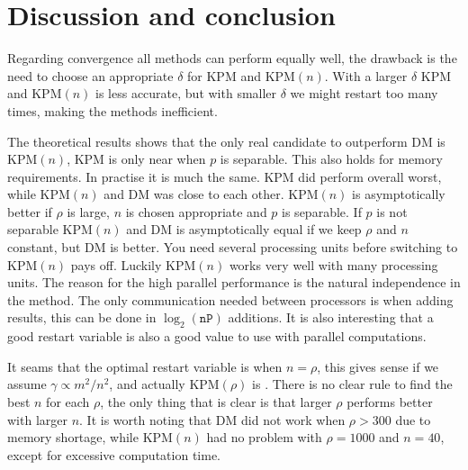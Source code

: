 \chapter{Discussion and conclusion}%
Regarding convergence all methods can perform equally well, the drawback is the need to choose an appropriate $\delta$ for KPM and KPM$(n)$. With a larger $\delta$ KPM and KPM$(n)$ is less accurate, but with smaller $\delta$ we might restart too many times, making the methods inefficient. 


The theoretical results shows that the only real candidate to outperform DM is KPM$(n)$, KPM is only near when $p$ is separable. This also holds for memory requirements. In practise it is much the same. KPM did perform overall worst, while KPM$(n)$ and DM was close to each other. KPM$(n)$ is asymptotically better if $\rho$ is large, $n$ is chosen appropriate and $p$ is separable. If $p$ is not separable  KPM$(n)$ and DM is asymptotically equal if we keep $\rho$ and $n$ constant, but DM is better. You need several processing units before switching to KPM$(n)$ pays off. Luckily KPM$(n)$ works very well with many processing units. The reason for the high parallel performance is the natural independence in the method. The only communication needed between processors is when adding results, this can be done in $\log_2(\texttt{nP})$ additions. It is also interesting that a good restart variable is also a good value to use with parallel computations.


It seams that the optimal restart variable is when $n = \rho$, this gives sense if we assume $\gamma \propto m^2/n^2$, and actually KPM$(\rho)$ is . 
There is no clear rule to find the best $n$ for each $\rho$, the only thing that is clear is that larger $\rho$ performs better with larger $n$. It is worth noting that DM did not work when $\rho>300$ due to memory shortage, while KPM$(n)$ had no problem with $\rho = 1000$ and $n = 40$, except for excessive computation time. \\




